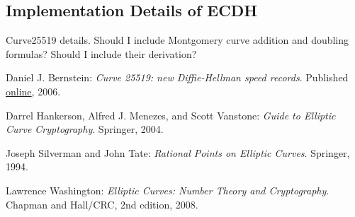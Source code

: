 \documentclass{article}
\begin{document}
\subsection{Implementation Details of ECDH}
Curve25519 details.
Should I include Montgomery curve addition and doubling formulas?
Should I include their derivation?

\clearpage

\begin{thebibliography}{9}

	Daniel J. Bernstein:
	\emph{Curve 25519: new Diffie-Hellman speed records}.
	Published \href{http://cr.yp.to/ecdh/curve25519-20060209.pdf}{online},
	2006.

	Darrel Hankerson, Alfred J. Menezes, and Scott Vanstone:
	\emph{Guide to Elliptic Curve Cryptography}.
	Springer,
	2004.

	Joseph Silverman and John Tate:
	\emph{Rational Points on Elliptic Curves}.
	Springer,
	1994.

	Lawrence Washington:
	\emph{Elliptic Curves: Number Theory and Cryptography}.
	Chapman and Hall/CRC,
	2nd edition,
	2008.

\end{thebibliography}
\end{document}
